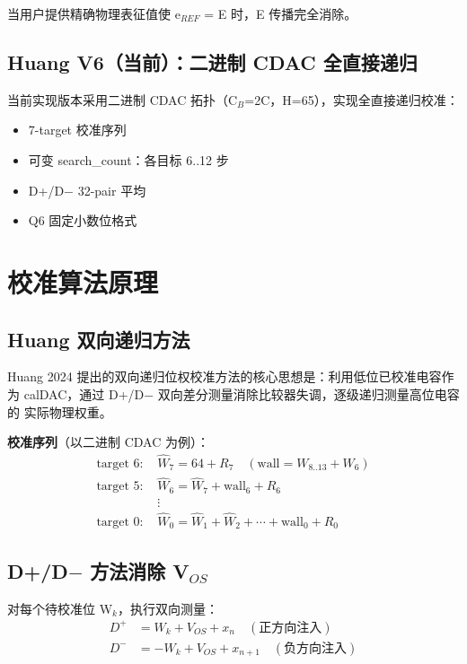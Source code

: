 \documentclass[UTF8,a4paper,12pt]{ctexart}
\theoremstyle{definition}
\begin{document}
当用户提供精确物理表征值使 e$_{REF}$ = E 时，E 传播完全消除。

\subsection{Huang V6（当前）：二进制 CDAC 全直接递归}

当前实现版本采用二进制 CDAC 拓扑（C$_B$=2C，H=65），实现全直接递归校准：
\begin{itemize}
  \item 7-target 校准序列
  \item 可变 search\_count：各目标 6..12 步
  \item D+/D$-$ 32-pair 平均
  \item Q6 固定小数位格式
\end{itemize}

\section{校准算法原理}

\subsection{Huang 双向递归方法}

Huang 2024 提出的双向递归位权校准方法的核心思想是：利用低位已校准电容作为
calDAC，通过 D+/D$-$ 双向差分测量消除比较器失调，逐级递归测量高位电容的
实际物理权重。

\textbf{校准序列}（以二进制 CDAC 为例）：
\begin{align*}
\text{target 6: } &\hat W_7 = 64 + R_7 \quad (\text{wall} = W_{8..13} + W_6) \\
\text{target 5: } &\hat W_6 = \hat W_7 + \text{wall}_{6} + R_6 \\
&\vdots \\
\text{target 0: } &\hat W_0 = \hat W_1 + \hat W_2 + \cdots + \text{wall}_0 + R_0
\end{align*}

\subsection{D+/D$-$ 方法消除 V$_{OS}$}

对每个待校准位 W$_k$，执行双向测量：
\begin{align*}
D^+ &= W_k + V_{OS} + x_n \quad (\text{正方向注入}) \\
D^- &= -W_k + V_{OS} + x_{n+1} \quad (\text{负方向注入})
\end{align*}
\end{document}
